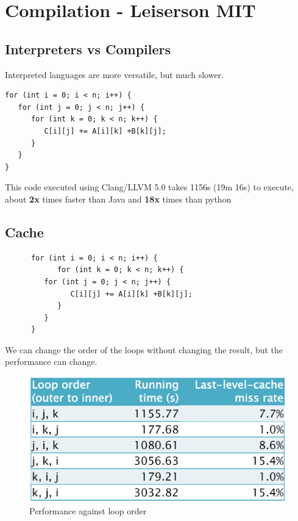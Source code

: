 \chapter{Compilation - Leiserson MIT}
\section{Interpreters vs Compilers}
Interpreted languages are more versatile, but much slower.
\begin{lstlisting}
for (int i = 0; i < n; i++) {
   for (int j = 0; j < n; j++) {
      for (int k = 0; k < n; k++) {
         C[i][j] += A[i][k] +B[k][j];
      }
   }
}
\end{lstlisting}
This code executed using Clang/LLVM 5.0 takes 1156s (19m 16s) to execute, about \textbf{2x} times faster than Java and \textbf{18x} times than python


\section{Cache}
\begin{paracol}{2}
   \colfill
   \begin{lstlisting}
      for (int i = 0; i < n; i++) {
            for (int k = 0; k < n; k++) {
         for (int j = 0; j < n; j++) {
               C[i][j] += A[i][k] +B[k][j];
            }
         }
      }
   \end{lstlisting}
   \colfill

   We can change the order of the loops without changing the result, but the performance can change.

   \switchcolumn

   \begin{figure}[htbp]
      \centering
      \includegraphics[width=0.9\columnwidth]{images/02/caches_looporder.png}
      \caption{Performance against loop order}
      \label{fig:02/caches_looporder}
   \end{figure}
   
\end{paracol}

